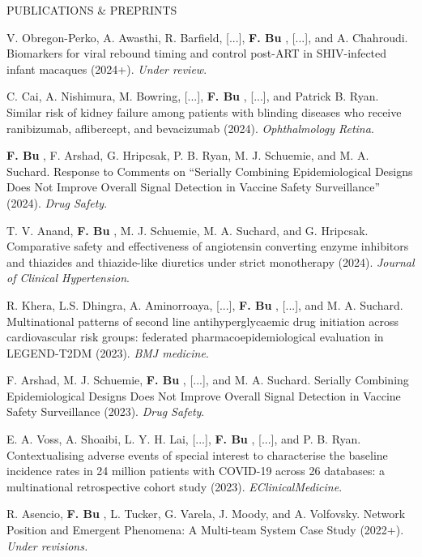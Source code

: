 \documentclass{resume} %
\newcommand{\myName}[1]{
	\textbf{#1}
}
\begin{document}
\begin{rSection}{PUBLICATIONS \& PREPRINTS}
\smallskip 

V. Obregon-Perko, A. Awasthi, R. Barfield, [...], \myName{F. Bu}, [...], and A. Chahroudi. Biomarkers for viral rebound timing and control post-ART in SHIV-infected infant macaques (2024+). \emph{Under review}.

\smallskip 

C. Cai, A. Nishimura, M. Bowring, [...], \myName{F. Bu}, [...], and Patrick B. Ryan. Similar risk of kidney failure among patients with blinding diseases who receive ranibizumab, aflibercept, and bevacizumab (2024). \emph{Ophthalmology Retina}.

\smallskip 

\myName{F. Bu}, F. Arshad, G. Hripcsak, P. B. Ryan, M. J. Schuemie, and M. A. Suchard. Response to Comments on ``Serially Combining Epidemiological Designs Does Not Improve Overall Signal Detection in Vaccine Safety Surveillance'' (2024). \emph{Drug Safety}. 

\smallskip 

T. V. Anand, \myName{F. Bu}, M. J. Schuemie, M. A. Suchard, and G. Hripcsak. Comparative safety and effectiveness of angiotensin converting enzyme inhibitors and thiazides and thiazide-like diuretics under strict monotherapy (2024).  \emph{Journal of Clinical Hypertension}.

\smallskip 

R. Khera, L.S. Dhingra, A. Aminorroaya, [...], \myName{F. Bu}, [...], and  M. A. Suchard.  Multinational patterns of second line antihyperglycaemic drug initiation across cardiovascular risk groups: federated pharmacoepidemiological evaluation in LEGEND-T2DM (2023). \emph{BMJ medicine}. 

\smallskip

F. Arshad, M. J. Schuemie, \myName{F. Bu}, [...], and M. A. Suchard. Serially Combining Epidemiological Designs Does Not Improve Overall Signal Detection in Vaccine Safety Surveillance (2023). \emph{Drug Safety}. 

\smallskip

E. A. Voss, A. Shoaibi, L. Y. H. Lai,  [...], \myName{F. Bu}, [...], and P. B. Ryan. Contextualising adverse events of special interest to characterise the baseline incidence rates in 24 million patients with COVID-19 across 26 databases: a multinational retrospective cohort study (2023). \emph{EClinicalMedicine}. 


\smallskip

R. Asencio, \myName{F. Bu}, L. Tucker, G. Varela, J. Moody, and A. Volfovsky. 
Network Position and Emergent Phenomena: A Multi-team System Case Study (2022+). \emph{Under revisions.}


\end{rSection}
\end{document}

